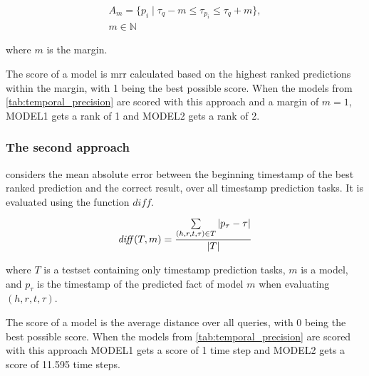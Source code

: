 \begin{equation}
\begin{gathered}
A_m = \{ p_i \mid \tau_{q} - m \le \tau_{p_i} \le \tau_{q} + m \},\\
m \in \mathbb{N}
\end{gathered}
\end{equation}

where $m$ is the margin. 

The score of a model is \gls{mrr} calculated based on the highest ranked predictions within the margin, with 1 being the best possible score.
When the models from \autoref{tab:temporal_precision} are scored with this approach and a margin of $m=1$, \textsc{MODEL1} gets a rank of 1 and \textsc{MODEL2} gets a rank of 2.

\subsubsection{The second approach}
considers the mean absolute error between the beginning timestamp of the best ranked prediction and the correct result, over all timestamp prediction tasks. It is evaluated using the function $\mathit{diff}$.

\begin{equation}
\mathit{diff}(T, m) = \frac{\sum\limits_{(h, r, t, \tau) \in T} | p_\tau - \tau | }{|T|}
\end{equation}

\noindent
where $T$ is a testset containing only timestamp prediction tasks, $m$ is a model, and $p_\tau$ is the timestamp of the predicted fact of model $m$ when evaluating $(h, r, t, \tau)$.

The score of a model is the average distance over all queries, with 0 being the best possible score. When the models from \autoref{tab:temporal_precision} are scored with this approach \textsc{MODEL1} gets a score of 1 time step and \textsc{MODEL2} gets a score of 11.595 time steps.

